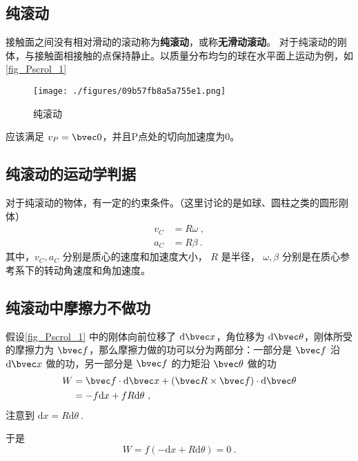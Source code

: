 

\subsection{纯滚动}
接触面之间没有相对滑动的滚动称为\textbf{纯滚动}，或称\textbf{无滑动滚动}。
对于纯滚动的刚体，与接触面相接触的点保持静止。以质量分布均匀的球在水平面上运动为例，如\autoref{fig_Pscrol_1}
\begin{figure}[ht]
\centering
\texttt{[image: ./figures/09b57fb8a5a755e1.png]}
\caption{纯滚动} \label{fig_Pscrol_1}
\end{figure}
应该满足 $v_P=\bvec 0$，并且P点处的切向加速度为0。

\subsection{纯滚动的运动学判据}
对于纯滚动的物体，有一定的约束条件。（这里讨论的是如球、圆柱之类的圆形刚体）
\begin{equation}
\begin{aligned}
v_C&=R\omega~,\\
a_C&=R\beta~.
\end{aligned}
\end{equation}
其中，$v_C,a_C$
分别是质心的速度和加速度大小，
$R$ 是半径，
$\omega,\beta$ 分别是在质心参考系下的转动角速度和角加速度。

\subsection{纯滚动中摩擦力不做功}
假设\autoref{fig_Pscrol_1} 中的刚体向前位移了 $\mathrm{d}\bvec x$，角位移为 $\mathrm{d} \bvec \theta$，刚体所受的摩擦力为 $\bvec f$，那么摩擦力做的功可以分为两部分：一部分是 $\bvec f$ 沿 $\mathrm{d} \bvec x$ 做的功，另一部分是 $\bvec f$ 的力矩沿 $\bvec \theta$ 做的功
\begin{equation}
\begin{aligned}
W&=\bvec f\cdot\mathrm{d} \bvec x+(\bvec R\times \bvec f)\cdot\mathrm{d} \bvec \theta\\
&=-f\mathrm{d} x+fR\mathrm{d} \theta~,
\end{aligned}
\end{equation}
注意到 $\mathrm{d} x=R\mathrm{d} \theta~.$

于是\begin{equation}
W=f(-\mathrm{d} x+R\mathrm{d} \theta)=0~.
\end{equation}
